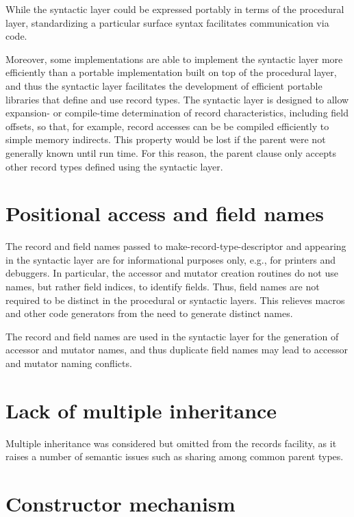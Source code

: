 \documentclass[twoside,twocolumn]{algol60}
\begin{document}
While the syntactic layer could be expressed portably in terms of the
procedural layer, standardizing a particular surface syntax
facilitates communication via code.

Moreover, some implementations are able to implement the syntactic
layer more efficiently than
a portable implementation built on top of the procedural layer, and
thus the syntactic layer facilitates the development of efficient portable libraries
that define and use record types.  The syntactic layer is designed to
allow expansion- or compile-time determination of record
characteristics, including field offsets, so that, for example, record
accesses can be be compiled efficiently to simple memory indirects.
This property would be lost if the parent were not generally known
until run time.  For this reason, the {\cf parent} clause only accepts
other record types defined using the syntactic layer.

\section{Positional access and field names}

The record and field names passed to {\cf make-record-type-descriptor}
and appearing in the syntactic layer are for informational purposes
only, e.g., for printers and debuggers.  In particular, the accessor
and mutator creation routines do not use names, but rather field
indices, to identify fields.
Thus, field names are not required to be distinct in the procedural or
syntactic layers.  This relieves macros and other code generators from
the need to generate distinct names.

The record and field names are used in the syntactic layer for the
generation of accessor and mutator names, and thus duplicate field names
may lead to accessor and mutator naming conflicts.

\section{Lack of multiple inheritance}

Multiple inheritance was considered but omitted from the records
facility, as it raises a number of semantic issues such as sharing
among common parent types.

\section{Constructor mechanism}
\end{document}
